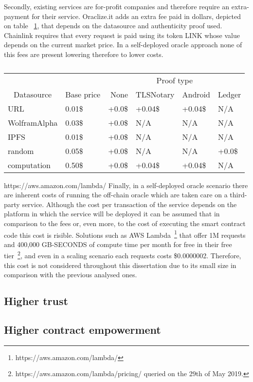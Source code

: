 Secondly, existing services are for-profit companies and therefore require an extra-payment for their service. Oraclize.it adds an extra fee paid in dollars, depicted on table ~\ref{tab:oraclize-fees}, that depends on the datasource and authenticity proof used. Chainlink requires that every request is paid using its token LINK whose value depends on the current market price. In a self-deployed oracle approach none of this fees are present lowering therefore to lower costs.

\begin{table}[]
\centering
\begin{tabular}{@{}llllll@{}}
\cmidrule(l){3-6}
    & \multicolumn{1}{l|}{} & \multicolumn{4}{c|}{Proof type} \\ \cmidrule(r){1-2}
\multicolumn{1}{c}{Datasource} & \multicolumn{1}{c}{Base price} & \multicolumn{1}{r}{None} & \multicolumn{1}{r}{TLSNotary} & \multicolumn{1}{r}{Android} & \multicolumn{1}{r}{Ledger} \\ \midrule
URL & 0.01\$ & +0.0\$ & +0.04\$ & +0.04\$ & N/A \\
WolframAlpha & 0.03\$ & +0.0\$ & N/A & N/A & N/A \\
IPFS & 0.01\$ & +0.0\$ & N/A & N/A & N/A \\
random & 0.05\$ & +0.0\$ & N/A & N/A & +0.0\$ \\
computation & 0.50\$ & +0.0\$ & +0.04\$ & +0.04\$ & N/A \\ \bottomrule
\end{tabular}
\caption{}
\label{tab:oraclize-fees}
\end{table}
https://aws.amazon.com/lambda/
Finally, in a self-deployed oracle scenario there are inherent costs of running the off-chain oracle which are taken care on a third-party service. Although the cost per transaction of the service depends on the platform in which the service will be deployed it can be assumed that in comparison to the fees or, even more, to the cost of executing the smart contract code this cost is risible. Solutions such as AWS Lambda~\footnote{https://aws.amazon.com/lambda/} that offer 1M requests and 400,000 GB-SECONDS of compute time per month for free in their free tier~\footnote{https://aws.amazon.com/lambda/pricing/ queried on the 29th of May 2019.}, and even in a scaling scenario each requests costs \$0.0000002. Therefore, this cost is not considered throughout this dissertation due to its small size in comparison with the previous analysed ones.

\subsection{Higher trust}

\subsection{Higher contract empowerment}